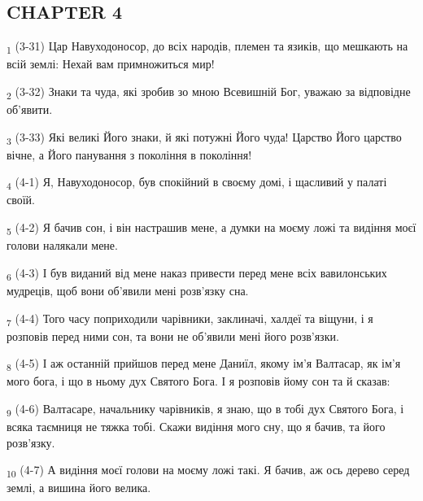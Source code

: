 \subsection{CHAPTER 4}
\begin{tcolorbox}
\textsubscript{1} (3-31) Цар Навуходоносор, до всіх народів, племен та язиків, що мешкають на всій землі: Нехай вам примножиться мир!
\end{tcolorbox}
\begin{tcolorbox}
\textsubscript{2} (3-32) Знаки та чуда, які зробив зо мною Всевишній Бог, уважаю за відповідне об'явити.
\end{tcolorbox}
\begin{tcolorbox}
\textsubscript{3} (3-33) Які великі Його знаки, й які потужні Його чуда! Царство Його царство вічне, а Його панування з покоління в покоління!
\end{tcolorbox}
\begin{tcolorbox}
\textsubscript{4} (4-1) Я, Навуходоносор, був спокійний в своєму домі, і щасливий у палаті своїй.
\end{tcolorbox}
\begin{tcolorbox}
\textsubscript{5} (4-2) Я бачив сон, і він настрашив мене, а думки на моєму ложі та видіння моєї голови налякали мене.
\end{tcolorbox}
\begin{tcolorbox}
\textsubscript{6} (4-3) І був виданий від мене наказ привести перед мене всіх вавилонських мудреців, щоб вони об'явили мені розв'язку сна.
\end{tcolorbox}
\begin{tcolorbox}
\textsubscript{7} (4-4) Того часу поприходили чарівники, заклиначі, халдеї та віщуни, і я розповів перед ними сон, та вони не об'явили мені його розв'язки.
\end{tcolorbox}
\begin{tcolorbox}
\textsubscript{8} (4-5) І аж останній прийшов перед мене Даниїл, якому ім'я Валтасар, як ім'я мого бога, і що в ньому дух Святого Бога. І я розповів йому сон та й сказав:
\end{tcolorbox}
\begin{tcolorbox}
\textsubscript{9} (4-6) Валтасаре, начальнику чарівників, я знаю, що в тобі дух Святого Бога, і всяка таємниця не тяжка тобі. Скажи видіння мого сну, що я бачив, та його розв'язку.
\end{tcolorbox}
\begin{tcolorbox}
\textsubscript{10} (4-7) А видіння моєї голови на моєму ложі такі. Я бачив, аж ось дерево серед землі, а вишина його велика.
\end{tcolorbox}
